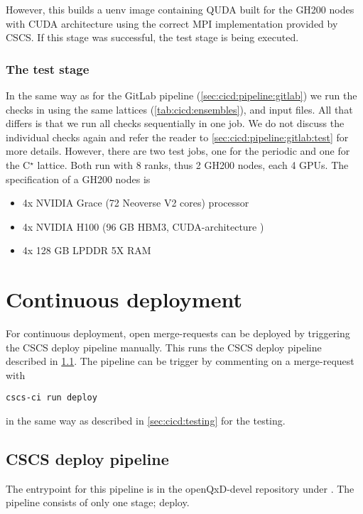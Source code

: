 However, this builds a uenv image containing QUDA built for the GH200 nodes with CUDA architecture  using the correct MPI implementation provided by CSCS. If this stage was successful, the test stage is being executed.

\subsubsection{The test stage}

In the same way as for the GitLab pipeline (\cref{sec:cicd:pipeline:gitlab}) we run the checks in  using the same lattices (\cref{tab:cicd:ensembles}), and input files. All that differs is that we run all checks sequentially in one job. We do not discuss the individual checks again and refer the reader to \cref{sec:cicd:pipeline:gitlab:test} for more details. However, there are two test jobs, one for the periodic and one for the C$^{\star}$ lattice. Both run with 8 ranks, thus 2 GH200 nodes, each 4 GPUs. The specification of a GH200 nodes is
\begin{itemize}
    \item 4x NVIDIA Grace (72 Neoverse V2 cores) processor
    \item 4x NVIDIA H100 (96 GB HBM3, CUDA-architecture )
    \item 4x 128 GB LPDDR 5X RAM
\end{itemize}

\section{Continuous deployment}

For continuous deployment, open merge-requests can be deployed by triggering the CSCS deploy pipeline manually. This runs the CSCS deploy pipeline described in \cref{sec:cd:pipeline:cscs}. The pipeline can be trigger by commenting on a merge-request with
\begin{verbatim}
cscs-ci run deploy
\end{verbatim}
in the same way as described in \cref{sec:cicd:testing} for the testing.

\subsection{CSCS deploy pipeline}
\label{sec:cd:pipeline:cscs}

The entrypoint for this pipeline is in the openQxD-devel repository\cite{gitlab:openqxd-devel} under . The pipeline consists of only one stage; deploy.

